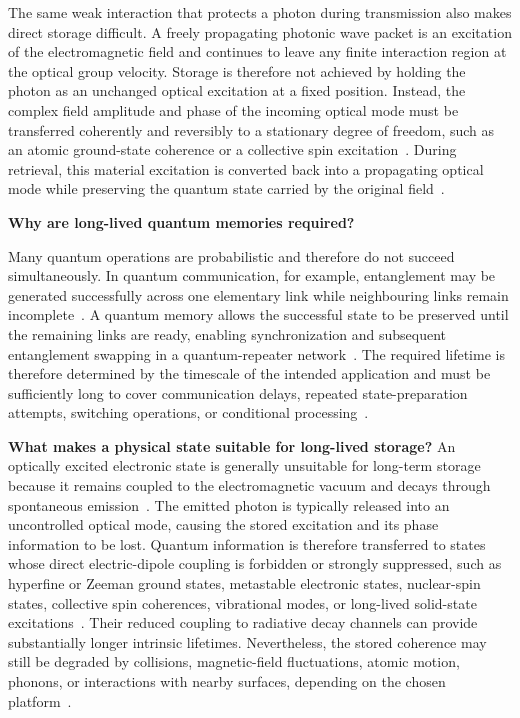 The same weak interaction that protects a photon during transmission also makes direct storage difficult. A freely propagating photonic wave packet is an excitation of the electromagnetic field and continues to leave any finite interaction region at the optical group velocity. Storage is therefore not achieved by holding the photon as an unchanged optical excitation at a fixed position. Instead, the complex field amplitude and phase of the incoming optical mode must be transferred coherently and reversibly to a stationary degree of freedom, such as an atomic ground-state coherence or a collective spin excitation~\cite{QmfpDp_FleischhauerEtAl_2002,Qmeaara_HeshamiEtAl_2016}. During retrieval, this material excitation is converted back into a propagating optical mode while preserving the quantum state carried by the original field~\cite{Oqm_LvovskyEtAl_2009,Qmeaara_HeshamiEtAl_2016}.

\noindent\textbf{Why are long-lived quantum memories required?}

Many quantum operations are probabilistic and therefore do not succeed simultaneously. In quantum communication, for example, entanglement may be generated successfully across one elementary link while neighbouring links remain incomplete~\cite{Lqcwaealo_DuanEtAl_2001}. A quantum memory allows the successful state to be preserved until the remaining links are ready, enabling synchronization and subsequent entanglement swapping in a quantum-repeater network~\cite{Lqcwaealo_DuanEtAl_2001,Qmeaara_HeshamiEtAl_2016,Oqm_LvovskyEtAl_2009}. The required lifetime is therefore determined by the timescale of the intended application and must be sufficiently long to cover communication delays, repeated state-preparation attempts, switching operations, or conditional processing~\cite{Qmeaara_HeshamiEtAl_2016,Oqm_LvovskyEtAl_2009}.

\noindent\textbf{What makes a physical state suitable for long-lived storage?}
An optically excited electronic state is generally unsuitable for long-term storage because it remains coupled to the electromagnetic vacuum and decays through spontaneous emission~\cite{Qmeaara_HeshamiEtAl_2016,Oqm_LvovskyEtAl_2009}. The emitted photon is typically released into an uncontrolled optical mode, causing the stored excitation and its phase information to be lost. Quantum information is therefore transferred to states whose direct electric-dipole coupling is forbidden or strongly suppressed, such as hyperfine or Zeeman ground states, metastable electronic states, nuclear-spin states, collective spin coherences, vibrational modes, or long-lived solid-state excitations~\cite{Qmeaara_HeshamiEtAl_2016,AWAVQMitCoSR_Rodriguez_}. Their reduced coupling to radiative decay channels can provide substantially longer intrinsic lifetimes. Nevertheless, the stored coherence may still be degraded by collisions, magnetic-field fluctuations, atomic motion, phonons, or interactions with nearby surfaces, depending on the chosen platform~\cite{Qmeaara_HeshamiEtAl_2016,AWAVQMitCoSR_Rodriguez_}.

